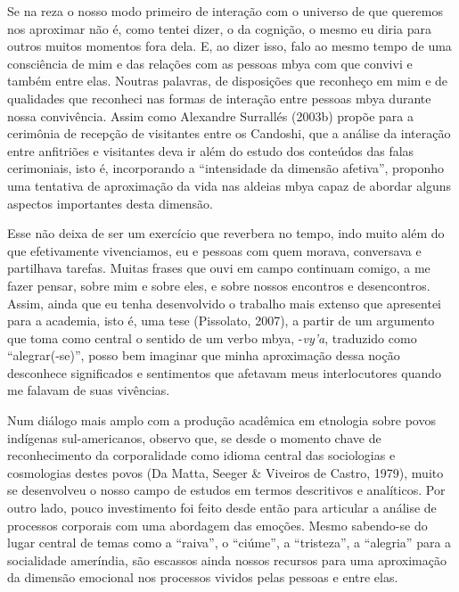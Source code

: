 Se na reza o nosso modo primeiro de interação com o universo de que
queremos nos aproximar não é, como tentei dizer, o da cognição, o mesmo
eu diria para outros muitos momentos fora dela. E, ao dizer isso, falo
ao mesmo tempo de uma consciência de mim e das relações com as pessoas
mbya com que convivi e também entre elas. Noutras palavras, de
disposições que reconheço em mim e de qualidades que reconheci nas
formas de interação entre pessoas mbya durante nossa convivência. Assim
como Alexandre Surrallés (2003b) propõe para a cerimônia de recepção de
visitantes entre os Candoshi, que a análise da interação entre
anfitriões e visitantes deva ir além do estudo dos conteúdos das falas
cerimoniais, isto é, incorporando a ``intensidade da dimensão afetiva'',
proponho uma tentativa de aproximação da vida nas aldeias mbya capaz de
abordar alguns aspectos importantes desta dimensão.

Esse não deixa de ser um exercício que reverbera no tempo, indo muito
além do que efetivamente vivenciamos, eu e pessoas com quem morava,
conversava e partilhava tarefas. Muitas frases que ouvi em campo
continuam comigo, a me fazer pensar, sobre mim e sobre eles, e sobre
nossos encontros e desencontros. Assim, ainda que eu tenha desenvolvido
o trabalho mais extenso que apresentei para a academia, isto é, uma tese
(Pissolato, 2007), a partir de um argumento que toma como central o
sentido de um verbo mbya, -\emph{vy'a}, traduzido como ``alegrar(-se)'',
posso bem imaginar que minha aproximação dessa noção desconhece
significados e sentimentos que afetavam meus interlocutores quando me
falavam de suas vivências.

Num diálogo mais amplo com a produção acadêmica em etnologia sobre povos
indígenas sul-americanos, observo que, se desde o momento chave de
reconhecimento da corporalidade como idioma central das sociologias e
cosmologias destes povos (Da Matta, Seeger \& Viveiros de Castro, 1979),
muito se desenvolveu o nosso campo de estudos em termos descritivos e
analíticos. Por outro lado, pouco investimento foi feito desde então
para articular a análise de processos corporais com uma abordagem das
emoções. Mesmo sabendo-se do lugar central de temas como a ``raiva'', o
``ciúme'', a ``tristeza'', a ``alegria'' para a socialidade ameríndia,
são escassos ainda nossos recursos para uma aproximação da dimensão
emocional nos processos vividos pelas pessoas e entre elas.

